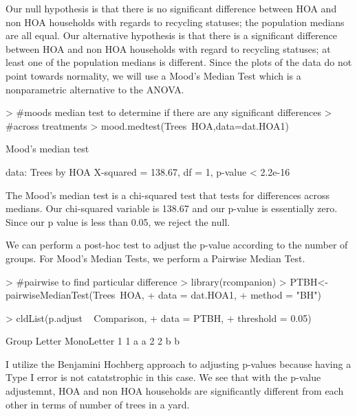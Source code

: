 \documentclass{article}
\begin{document}
Our null hypothesis is that there is no significant difference between HOA and non HOA households with regards to recycling statuses; the population medians are all equal. Our alternative hypothesis is that there is a significant difference between HOA and non HOA households with regard to recycling statuses; at least one of the population medians is different. Since the plots of the data do not point towards normality, we will use a Mood's Median Test which is a nonparametric alternative to the ANOVA.

\begin{Schunk}
\begin{Sinput}
> #moods median test to determine if there are any significant differences
> #across treatments
> mood.medtest(Trees~HOA,data=dat.HOA1)
\end{Sinput}
\begin{Soutput}
	Mood's median test

data:  Trees by HOA
X-squared = 138.67, df = 1, p-value < 2.2e-16
\end{Soutput}
\end{Schunk}

The Mood's median test is a chi-squared test that tests for differences across medians. Our chi-squared variable is 138.67 and our p-value is essentially zero. Since our p value is less than 0.05, we reject the null.

We can perform a post-hoc test to adjust the p-value according to the number of groups. For Mood's Median Tests, we perform a Pairwise Median Test. 

\begin{Schunk}
\begin{Sinput}
> #pairwise to find particular difference
> library(rcompanion)
> PTBH<-pairwiseMedianTest(Trees~HOA,
+                        data   = dat.HOA1,
+                        method = "BH")
\end{Sinput}
\end{Schunk}

\begin{Schunk}
\begin{Sinput}
> cldList(p.adjust ~ Comparison,
+         data = PTBH,
+         threshold = 0.05)
\end{Sinput}
\begin{Soutput}
  Group Letter MonoLetter
1     1      a         a 
2     2      b          b
\end{Soutput}
\end{Schunk}

I utilize the Benjamini Hochberg approach \citep{rcompanion} to adjusting p-values because having a Type I error is not catatstrophic in this case. We see that with the p-value adjustemnt, HOA and non HOA households are significantly different from each other in terms of number of trees in a yard.
\end{document}
